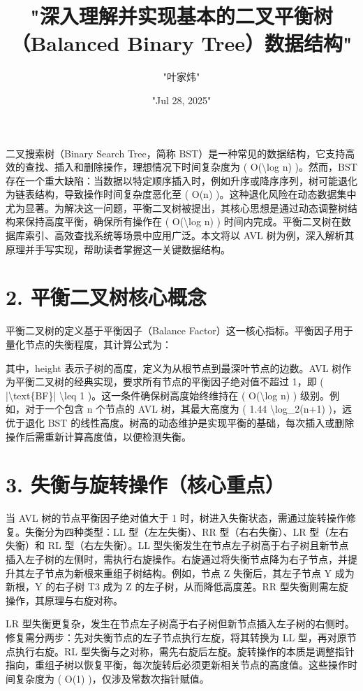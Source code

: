 \title{"深入理解并实现基本的二叉平衡树（Balanced Binary Tree）数据结构"}
\author{"叶家炜"}
\date{"Jul 28, 2025"}
\maketitle
二叉搜索树（Binary Search Tree，简称 BST）是一种常见的数据结构，它支持高效的查找、插入和删除操作，理想情况下时间复杂度为 ( O(\textbackslash{}log n) )。然而，BST 存在一个重大缺陷：当数据以特定顺序插入时，例如升序或降序序列，树可能退化为链表结构，导致操作时间复杂度恶化至 ( O(n) )。这种退化风险在动态数据集中尤为显著。为解决这一问题，平衡二叉树被提出，其核心思想是通过动态调整树结构来保持高度平衡，确保所有操作在 ( O(\textbackslash{}log n) ) 时间内完成。平衡二叉树在数据库索引、高效查找系统等场景中应用广泛。本文将以 AVL 树为例，深入解析其原理并手写实现，帮助读者掌握这一关键数据结构。\par
\chapter{2. 平衡二叉树核心概念}
平衡二叉树的定义基于平衡因子（Balance Factor）这一核心指标。平衡因子用于量化节点的失衡程度，其计算公式为：\par
[ \textbackslash{}text\{{}BF(node)\}{} = \textbackslash{}text\{{}height(left\_{}subtree)\}{} - \textbackslash{}text\{{}height(right\_{}subtree)\}{} ]\par
其中，height 表示子树的高度，定义为从根节点到最深叶节点的边数。AVL 树作为平衡二叉树的经典实现，要求所有节点的平衡因子绝对值不超过 1，即 ( |\textbackslash{}text\{{}BF\}{}| \textbackslash{}leq 1 )。这一条件确保树高度始终维持在 ( O(\textbackslash{}log n) ) 级别。例如，对于一个包含 n 个节点的 AVL 树，其最大高度为 ( 1.44 \textbackslash{}log\_{}2(n+1) )，远优于退化 BST 的线性高度。树高的动态维护是实现平衡的基础，每次插入或删除操作后需重新计算高度值，以便检测失衡。\par
\chapter{3. 失衡与旋转操作（核心重点）}
当 AVL 树的节点平衡因子绝对值大于 1 时，树进入失衡状态，需通过旋转操作修复。失衡分为四种类型：LL 型（左左失衡）、RR 型（右右失衡）、LR 型（左右失衡）和 RL 型（右左失衡）。LL 型失衡发生在节点左子树高于右子树且新节点插入左子树的左侧时，需执行右旋操作。右旋通过将失衡节点降为右子节点，并提升其左子节点为新根来重组子树结构。例如，节点 Z 失衡后，其左子节点 Y 成为新根，Y 的右子树 T3 成为 Z 的左子树，从而降低高度差。RR 型失衡则需左旋操作，其原理与右旋对称。\par
LR 型失衡更复杂，发生在节点左子树高于右子树但新节点插入左子树的右侧时。修复需分两步：先对失衡节点的左子节点执行左旋，将其转换为 LL 型，再对原节点执行右旋。RL 型失衡与之对称，需先右旋后左旋。旋转操作的本质是调整指针指向，重组子树以恢复平衡，每次旋转后必须更新相关节点的高度值。这些操作时间复杂度为 ( O(1) )，仅涉及常数次指针赋值。\par
